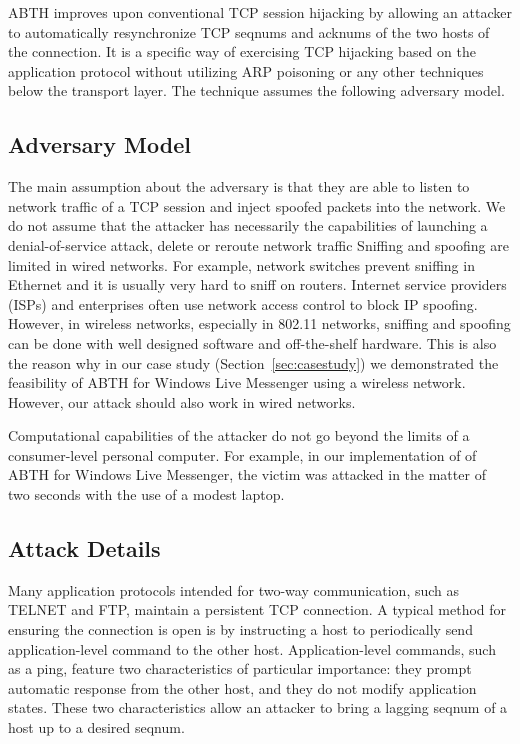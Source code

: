 \documentclass{sig-alternate}
\begin{document}
ABTH improves upon conventional TCP session hijacking by allowing an attacker to automatically resynchronize TCP seqnums and acknums of the two hosts of the connection.
It is a specific way of exercising TCP hijacking based on the application protocol without utilizing ARP poisoning or any other techniques below the transport layer.
The technique assumes the following adversary model.


\subsection{Adversary Model}
\label{sec:adversarymodel}

The main assumption about the adversary is that they are able to listen to network traffic of a TCP session and inject spoofed packets into the network.
We do not assume that the attacker has necessarily the capabilities of launching a denial-of-service attack, delete or reroute network traffic
Sniffing and spoofing are limited in wired networks.
For example, network switches prevent sniffing in Ethernet and it is usually very hard to sniff on routers.
Internet service providers (ISPs) and enterprises often use network access control to block IP spoofing.
However, in wireless networks, especially in 802.11 networks, sniffing and spoofing can be done with well designed software and off-the-shelf hardware.
This is also the reason why in our case study (Section~\ref{sec:casestudy}) we demonstrated the feasibility of ABTH for Windows Live Messenger using a wireless network.
However, our attack should also work in wired networks.

Computational capabilities of the attacker do not go beyond the limits of a consumer-level personal computer.
For example, in our implementation of of ABTH for Windows Live Messenger, the victim was attacked in the matter of two seconds with the use of a modest laptop.

\subsection{Attack Details}

Many application protocols intended for two-way communication, such as TELNET and FTP, maintain a persistent TCP connection.
A typical method for ensuring the connection is open is by instructing a host to periodically send application-level command to the other host.
Application-level commands, such as a ping, feature two characteristics of particular importance: they prompt automatic response from the other host, and they do not modify application states.
These two characteristics allow an attacker to bring a lagging seqnum of a host up to a desired seqnum.
\end{document}
